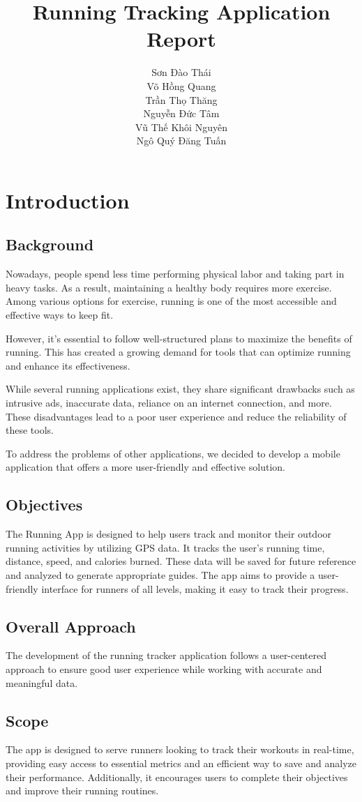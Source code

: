 \documentclass{article}
\title{Running Tracking Application Report}
\author{Sơn Đào Thái \\ Võ Hồng Quang \\ Trần Thọ Thăng \\ Nguyễn Đức Tâm \\Vũ Thế Khôi Nguyên \\ Ngô Quý Đăng Tuấn}
\date{}
\begin{document}
\maketitle

\section{Introduction}

\subsection{Background}

    Nowadays, people spend less time performing physical labor and taking part in heavy tasks. As a result, maintaining a healthy body requires more exercise. Among various options for exercise, running is one of the most accessible and effective ways to keep fit. 

    However, it's essential to follow well-structured plans to maximize the benefits of running. This has created a growing demand for tools that can optimize running and enhance its effectiveness.

    While several running applications exist, they share significant drawbacks such as intrusive ads, inaccurate data, reliance on an internet connection, and more. These disadvantages lead to a poor user experience and reduce the reliability of these tools.

    To address the problems of other applications, we decided to develop a mobile application that offers a more user-friendly and effective solution.

\subsection{Objectives}

    The Running App is designed to help users track and monitor their outdoor running activities by utilizing GPS data. It tracks the user's running time, distance, speed, and calories burned. These data will be saved for future reference and analyzed to generate appropriate guides. The app aims to provide a user-friendly interface for runners of all levels, making it easy to track their progress.

\subsection{Overall Approach}

    The development of the running tracker application follows a user-centered approach to ensure good user experience while working with accurate and meaningful data.

\subsection{Scope}

    The app is designed to serve runners looking to track their workouts in real-time, providing easy access to essential metrics and an efficient way to save and analyze their performance. Additionally, it encourages users to complete their objectives and improve their running routines.
\end{document}
